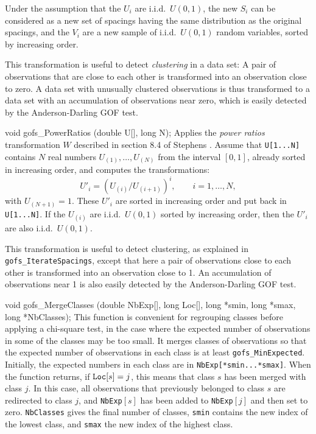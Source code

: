   Under the assumption that the $U_i$ are i.i.d.\ $U(0,1)$, the new
  $S_i$ can be considered as a new set of spacings having the same
  distribution as the original spacings, and the $V_i$ are a new sample
  of i.i.d.\ $U(0,1)$ random variables, sorted by increasing order.

  This transformation is useful to detect {\em clustering\/} in a data
  set: A pair of observations that are close to each other is transformed
  into an observation close to zero.  A data set with unusually clustered
  observations is thus transformed to a data set with an 
  accumulation of observations near zero, which is easily detected by
  the Anderson-Darling GOF test.
 \endtab
\code


void gofs_PowerRatios (double U[], long N);
\endcode
 \tab  Applies the {\em power ratios\/} transformation $W$ described
   in section 8.4 of Stephens \cite{tSTE86a}.
   Assume that {\tt U[1...N]} contains $N$ real numbers 
   $U_{(1)},\dots,U_{(N)}$ from the interval $[0,1]$,
   already sorted in increasing order, and computes the transformations:
     $$ U'_i = (U_{(i)} / U_{(i+1)})^i, \qquad  i=1,\dots,N,$$
   with $U_{(N+1)} = 1$.
   These $U'_i$ are sorted in increasing order and put back in 
   {\tt U[1...N]}.
   If the $U_{(i)}$ are i.i.d.\ $U(0,1)$ sorted by increasing order, 
   then the $U'_i$ are also i.i.d.\ $U(0,1)$.

  This transformation is useful to detect clustering, as explained in
  {\tt gofs\_IterateSpacings}, except that here a pair of
  observations close to each other is transformed
  into an observation close to 1.  
  An accumulation of observations near 1 is also easily detected by
  the Anderson-Darling GOF test.
 \endtab
\code


void gofs_MergeClasses (double NbExp[], long Loc[],
                        long *smin, long *smax, long *NbClasses);
\endcode
 \tab This function is convenient for regrouping classes before 
   applying a chi-square test,
   in the case where the expected number of observations in some of
   the classes may be too small.
   It merges classes of observations so that the expected
   number of observations in each class is at least
   {\tt gofs\_MinExpected}. Initially, the expected numbers in each class
   are in {\tt NbExp[*smin...*smax]}.
   When the function returns, if ${\tt Loc}[s] = j$, this means that class
   $s$ has been merged with class $j$.
   In this case, all observations that previously belonged to class $s$ 
   are redirected to class $j$, 
   and {\tt NbExp$[s]$} has been added to {\tt NbExp$[j]$}
   and then set to zero.
   {\tt NbClasses} gives the final number of classes,
   {\tt smin} contains the new index of the lowest class, 
   and {\tt smax} the new index of the highest class.
 \endtab
\code


